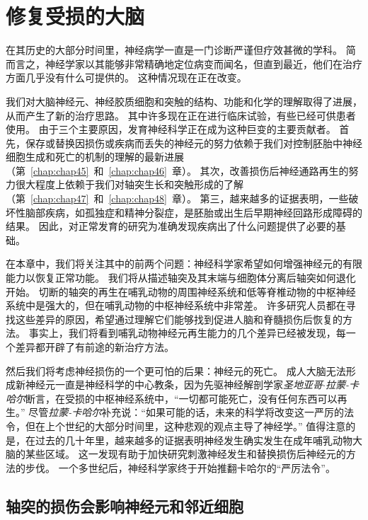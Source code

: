 \chapter{修复受损的大脑} \label{chap:chap50}

在其历史的大部分时间里，神经病学一直是一门诊断严谨但疗效甚微的学科。
简而言之，神经学家以其能够非常精确地定位病变而闻名，但直到最近，他们在治疗方面几乎没有什么可提供的。
这种情况现在正在改变。


我们对大脑神经元、神经胶质细胞和突触的结构、功能和化学的理解取得了进展，从而产生了新的治疗思路。
其中许多现在正在进行临床试验，有些已经可供患者使用。
由于三个主要原因，发育神经科学正在成为这种巨变的主要贡献者。
首先，保存或替换因损伤或疾病而丢失的神经元的努力依赖于我们对控制胚胎中神经细胞生成和死亡的机制的理解的最新进展（第~\ref{chap:chap45}~和~\ref{chap:chap46}~章）。
其次，改善损伤后神经通路再生的努力很大程度上依赖于我们对轴突生长和突触形成的了解（第~\ref{chap:chap47}~和~\ref{chap:chap48}~章）。
第三，越来越多的证据表明，一些破坏性脑部疾病，如孤独症和精神分裂症，是胚胎或出生后早期神经回路形成障碍的结果。
因此，对正常发育的研究为准确发现疾病出了什么问题提供了必要的基础。


在本章中，我们将关注其中的前两个问题：神经科学家希望如何增强神经元的有限能力以恢复正常功能。
我们将从描述轴突及其末端与细胞体分离后轴突如何退化开始。
切断的轴突的再生在哺乳动物的周围神经系统和低等脊椎动物的中枢神经系统中是强大的，但在哺乳动物的中枢神经系统中非常差。
许多研究人员都在寻找这些差异的原因，希望通过理解它们能够找到促进人脑和脊髓损伤后恢复的方法。
事实上，我们将看到哺乳动物神经元再生能力的几个差异已经被发现，每一个差异都开辟了有前途的新治疗方法。


然后我们将考虑神经损伤的一个更可怕的后果：神经元的死亡。
成人大脑无法形成新神经元一直是神经科学的中心教条，因为先驱神经解剖学家\textit{圣地亚哥$\cdot$拉蒙-卡哈尔}断言，在受损的中枢神经系统中，“一切都可能死亡，没有任何东西可以再生。” 
尽管\textit{拉蒙-卡哈尔}补充说：“如果可能的话，未来的科学将改变这一严厉的法令，但在上个世纪的大部分时间里，这种悲观的观点主导了神经学。”
值得注意的是，在过去的几十年里，越来越多的证据表明神经发生确实发生在成年哺乳动物大脑的某些区域。
这一发现有助于加快研究刺激神经发生和替换损伤后神经元的方法的步伐。
一个多世纪后，神经科学家终于开始推翻卡哈尔的“严厉法令”。



\section{轴突的损伤会影响神经元和邻近细胞}

